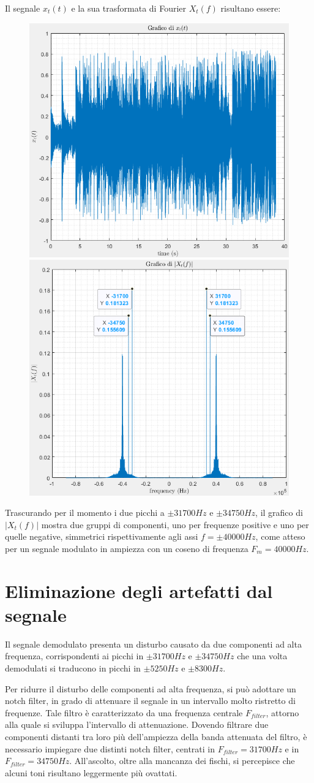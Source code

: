\documentclass[12pt]{article}
\begin{document}
Il segnale $x_{t}(t)$ e la sua trasformata di Fourier $X_{t}(f)$ risultano essere:
\begin{figure}[H]
	\centering
	\includegraphics[width=0.45\linewidth]{./images/x_t.png}
	\includegraphics[width=0.45\linewidth]{./images/fft_x_t.png}
\end{figure}

Trascurando per il momento i due picchi a $\pm31700Hz$ e $\pm34750Hz$, il grafico di $|X_{t}(f)|$ mostra due gruppi di componenti, uno per frequenze positive e uno per quelle negative, simmetrici rispettivamente agli assi $f = \pm40000Hz$, come atteso per un segnale modulato in ampiezza con un coseno di frequenza $F_{m} = 40000Hz$.

\section{Eliminazione degli artefatti dal segnale}

Il segnale demodulato presenta un disturbo causato da due componenti ad alta frequenza, corrispondenti ai picchi in $\pm31700Hz$ e $\pm34750Hz$ che una volta demodulati si traducono in picchi in $\pm5250Hz$ e $\pm8300Hz$.

Per ridurre il disturbo delle componenti ad alta frequenza, si può adottare un notch filter, in grado di attenuare il segnale in un intervallo molto ristretto di frequenze. Tale filtro è caratterizzato da una frequenza centrale $F_{filter}$, attorno alla quale si sviluppa l'intervallo di attenuazione. Dovendo filtrare due componenti distanti tra loro più dell'ampiezza della banda attenuata del filtro, è necessario impiegare due distinti notch filter, centrati in $F_{filter} = 31700Hz$ e in $F_{filter} = 34750Hz$. All'ascolto, oltre alla mancanza dei fischi, si percepisce che alcuni toni risultano leggermente più ovattati.
\end{document}
